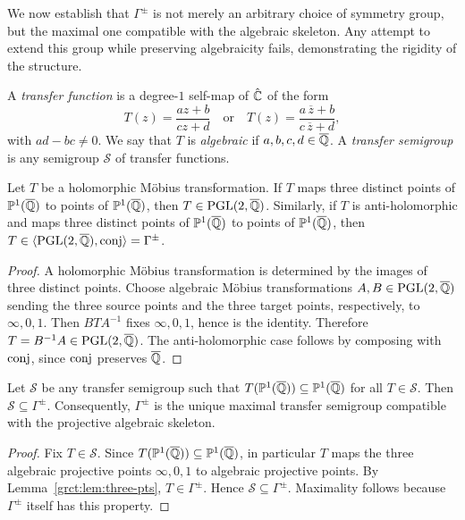 We now establish that $\Gamma^{\pm}$ is not merely an arbitrary choice of symmetry group, but the maximal one compatible with the algebraic skeleton. Any attempt to extend this group while preserving algebraicity fails, demonstrating the rigidity of the structure.

\begin{definition}\label{grct:def:transfer-semigroup}
	A \emph{transfer function} is a degree-$1$ self-map of $\hat{\mathbb{C}}$ of the form
	\[
		T(z)=\frac{az+b}{cz+d}\quad\text{or}\quad
		T(z)=\frac{a\,\overline z+b}{c\,\overline z+d},
	\]
	with $ad-bc\ne0$. We say that $T$ is \emph{algebraic} if $a,b,c,d\in\overline{\mathbb{Q}}$.
	A \emph{transfer semigroup} is any semigroup $\mathcal S$ of transfer functions.
\end{definition}

\begin{lemma}\label{grct:lem:three-pts}
	Let $T$ be a holomorphic M\"obius transformation. If $T$ maps three distinct points of $\mathbb{P}^{1}(\overline{\mathbb{Q}})$ to points of $\mathbb{P}^{1}(\overline{\mathbb{Q}})$, then $T\in\operatorname{PGL}(2,\overline{\mathbb{Q}})$.
	Similarly, if $T$ is anti-holomorphic and maps three distinct points of $\mathbb{P}^{1}(\overline{\mathbb{Q}})$ to points of $\mathbb{P}^{1}(\overline{\mathbb{Q}})$, then $T\in\langle \operatorname{PGL}(2,\overline{\mathbb{Q}}),\mathrm{conj}\rangle=\Gamma^{\pm}$.
\end{lemma}
\begin{proof}
	A holomorphic Möbius transformation is determined by the images of three distinct points. Choose algebraic Möbius transformations $A,B\in\operatorname{PGL}(2,\overline{\mathbb{Q}})$ sending the three source points and the three target points, respectively, to $\infty,0,1$. Then $BTA^{-1}$ fixes $\infty,0,1$, hence is the identity. Therefore $T=B^{-1}A\in\operatorname{PGL}(2,\overline{\mathbb{Q}})$. The anti-holomorphic case follows by composing with $\mathrm{conj}$, since $\mathrm{conj}$ preserves $\overline{\mathbb{Q}}$.
\end{proof}

\begin{theorem}\label{grct:thm:maximal-transfer}
	Let $\mathcal S$ be any transfer semigroup such that $T(\mathbb{P}^{1}(\overline{\mathbb{Q}}))\subseteq\mathbb{P}^{1}(\overline{\mathbb{Q}})$ for all $T\in\mathcal S$. Then $\mathcal S\subseteq \Gamma^{\pm}$. Consequently, $\Gamma^{\pm}$ is the unique maximal transfer semigroup compatible with the projective algebraic skeleton.
\end{theorem}
\begin{proof}
	Fix $T\in\mathcal S$. Since $T(\mathbb{P}^{1}(\overline{\mathbb{Q}}))\subseteq\mathbb{P}^{1}(\overline{\mathbb{Q}})$, in particular $T$ maps the three algebraic projective points $\infty,0,1$ to algebraic projective points. By Lemma~\ref{grct:lem:three-pts}, $T\in\Gamma^{\pm}$. Hence $\mathcal S\subseteq\Gamma^{\pm}$. Maximality follows because $\Gamma^{\pm}$ itself has this property.
\end{proof}

